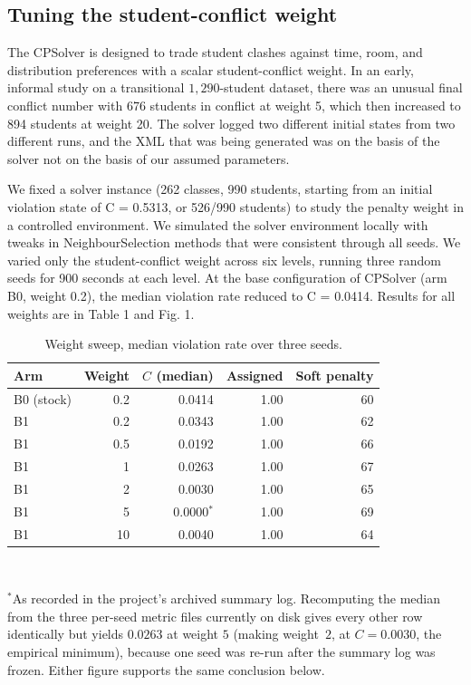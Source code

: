 \documentclass[journal]{IEEEtran}
\begin{document}
 \subsection{Tuning the student-conflict weight}

\label{sec:weight-sweep}

The CPSolver is designed to trade student clashes against time, room, and distribution preferences with a scalar student-conflict weight. In an early, informal study on a transitional $1{,}290$-student dataset, there was an unusual final conflict number with 676 students in conflict at weight 5, which then increased to 894 students at weight 20. The solver logged two different initial states from two different runs, and the XML that was being generated was on the basis of the solver not on the basis of our assumed parameters.

We fixed a solver instance (262 classes, 990 students, starting from an initial violation state of C = 0.5313, or 526/990 students) to study the penalty weight in a controlled environment.
We simulated the solver environment locally with tweaks in NeighbourSelection methods that were consistent through all seeds. We varied only the student-conflict weight across six levels, running three random seeds for 900 seconds at each level. At the base configuration of CPSolver (arm B0, weight 0.2), the median violation rate reduced to C = 0.0414. Results for all weights are in Table 1 and Fig. 1.

\begin{table}[t]
\centering
\caption{Weight sweep, median violation rate over three seeds.}
\label{tab:sweep}
\footnotesize
\begin{tabular}{@{}lrrrr@{}}
\toprule
Arm & Weight & $C$ (median) & Assigned & Soft penalty \\
\midrule
B0 (stock) & 0.2 & 0.0414 & 1.00 & 60 \\
B1 & 0.2 & 0.0343 & 1.00 & 62 \\
B1 & 0.5 & 0.0192 & 1.00 & 66 \\
B1 & 1 & 0.0263 & 1.00 & 67 \\
B1 & 2 & 0.0030 & 1.00 & 65 \\
B1 & 5 & 0.0000$^{*}$ & 1.00 & 69 \\
B1 & 10 & 0.0040 & 1.00 & 64 \\
\bottomrule
\end{tabular}
\\[2pt]
\raggedright\footnotesize $^{*}$As recorded in the project's archived summary log. Recomputing the median from the three per-seed metric files currently on disk gives every other row identically but yields $0.0263$ at weight $5$ (making weight~$2$, at $C=0.0030$, the empirical minimum), because one seed was re-run after the summary log was frozen. Either figure supports the same conclusion below.
\end{table}
\end{document}

